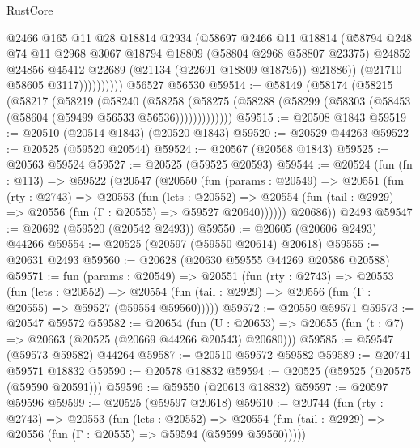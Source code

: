 \begin{lexlean}{RustCore}
\begin{coremodule}
                      @2466
                      @165
                      @11
                      @28
                      @18814
                      @2934
                      (@58697
                        @2466
                        @11
                        @18814
                        (@58794
                          @248
                          @74
                          @11
                          @2968
                          @3067
                          @18794
                          @18809
                          (@58804 @2968 @58807 @23375)
                          @24852
                          @24856
                          @45412
                          @22689
                          (@21134 (@22691 @18809 @18795))
                          @21886))
                      (@21710 @58605 @3117))))))))))
    @56527
    @56530
@59514 := @58149
    (@58174
      (@58215
        (@58217
          (@58219
            (@58240
              (@58258
                (@58275 (@58288 (@58299 (@58303 (@58453 (@58604 (@59499 @56533 @56536)))))))))))))
@59515 := @20508 @1843
@59519 := @20510 (@20514 @1843) (@20520 @1843)
@59520 := @20529 @44263
@59522 := @20525 (@59520 @20544)
@59524 := @20567 (@20568 @1843)
@59525 := @20563 @59524
@59527 := @20525 (@59525 @20593)
@59544 := @20524
    (fun (fn : @113) =>
    @59522
      (@20547
        (@20550
          (fun (params : @20549) =>
          @20551
            (fun (rty : @2743) =>
            @20553
              (fun (lets : @20552) =>
              @20554 (fun (tail : @2929) => @20556 (fun (Γ : @20555) => @59527 @20640))))))
        @20686))
    @2493
@59547 := @20692 (@59520 (@20542 @2493))
@59550 := @20605 (@20606 @2493) @44266
@59554 := @20525 (@20597 (@59550 @20614) @20618)
@59555 := @20631 @2493
@59560 := @20628 (@20630 @59555 @44269 @20586 @20588)
@59571 := fun (params : @20549) =>
  @20551
    (fun (rty : @2743) =>
    @20553
      (fun (lets : @20552) =>
      @20554 (fun (tail : @2929) => @20556 (fun (Γ : @20555) => @59527 (@59554 @59560)))))
@59572 := @20550 @59571
@59573 := @20547 @59572
@59582 := @20654
    (fun (U : @20653) => @20655 (fun (t : @7) => @20663 (@20525 (@20669 @44266 @20543) @20680)))
@59585 := @59547 (@59573 @59582) @44264
@59587 := @20510 @59572 @59582
@59589 := @20741 @59571 @18832
@59590 := @20578 @18832
@59594 := @20525 (@59525 (@20575 (@59590 @20591)))
@59596 := @59550 (@20613 @18832)
@59597 := @20597 @59596
@59599 := @20525 (@59597 @20618)
@59610 := @20744
    (fun (rty : @2743) =>
    @20553
      (fun (lets : @20552) =>
      @20554 (fun (tail : @2929) => @20556 (fun (Γ : @20555) => @59594 (@59599 @59560)))))

\end{coremodule}
\end{lexlean}

